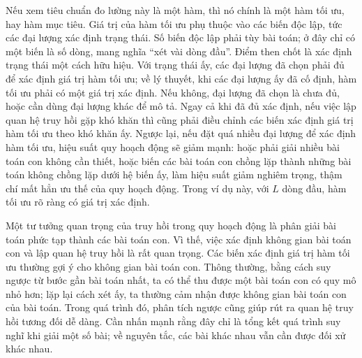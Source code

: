 \documentclass[11pt]{article}
\begin{document}
Nếu xem tiêu chuẩn đo lường này là một hàm, thì nó chính là một hàm tối ưu,
hay hàm mục tiêu. Giá trị của hàm tối ưu phụ thuộc vào các biến độc lập, tức
các đại lượng xác định trạng thái. Số biến độc lập phải tùy bài toán; ở đây
chỉ có một biến là số dòng, mang nghĩa ``xét vài dòng đầu''. Điểm then chốt là
xác định trạng thái một cách hữu hiệu. Với trạng thái ấy, các đại lượng đã
chọn phải đủ để xác định giá trị hàm tối ưu; về lý thuyết, khi các đại lượng
ấy đã cố định, hàm tối ưu phải có một giá trị xác định. Nếu không, đại lượng
đã chọn là chưa đủ, hoặc cần dùng đại lượng khác để mô tả. Ngay cả khi đã đủ
xác định, nếu việc lập quan hệ truy hồi gặp khó khăn thì cũng phải điều chỉnh
các biến xác định giá trị hàm tối ưu theo khó khăn ấy. Ngược lại, nếu đặt quá
nhiều đại lượng để xác định hàm tối ưu, hiệu suất quy hoạch động sẽ giảm mạnh:
hoặc phải giải nhiều bài toán con không cần thiết, hoặc biến các bài toán con
chồng lặp thành những bài toán không chồng lặp dưới hệ biến ấy, làm hiệu suất
giảm nghiêm trọng, thậm chí mất hẳn ưu thế của quy hoạch động. Trong ví dụ
này, với \(L\) dòng đầu, hàm tối ưu rõ ràng có giá trị xác định.

Một tư tưởng quan trọng của truy hồi trong quy hoạch động là phân giải bài
toán phức tạp thành các bài toán con. Vì thế, việc xác định không gian bài
toán con và lập quan hệ truy hồi là rất quan trọng. Các biến xác định giá trị
hàm tối ưu thường gợi ý cho không gian bài toán con. Thông thường, bằng cách
suy ngược từ bước gần bài toán nhất, ta có thể thu được một bài toán con có
quy mô nhỏ hơn; lặp lại cách xét ấy, ta thường cảm nhận được không gian bài
toán con của bài toán. Trong quá trình đó, phân tích ngược cũng giúp rút ra
quan hệ truy hồi tương đối dễ dàng. Cần nhấn mạnh rằng đây chỉ là tổng kết
quá trình suy nghĩ khi giải một số bài; về nguyên tắc, các bài khác nhau vẫn
cần được đối xử khác nhau.
\end{document}

